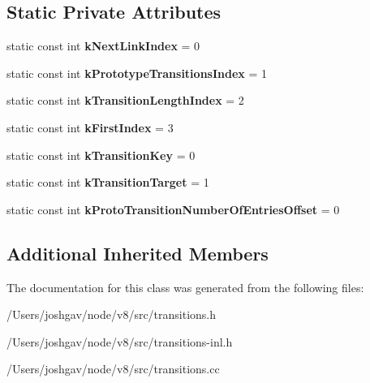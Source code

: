\subsection*{Static Private Attributes}
\begin{DoxyCompactItemize}
\item 
static const int {\bfseries k\+Next\+Link\+Index} = 0\hypertarget{classv8_1_1internal_1_1_transition_array_aec217c560f9c934a25f06aac965f37a6}{}\label{classv8_1_1internal_1_1_transition_array_aec217c560f9c934a25f06aac965f37a6}

\item 
static const int {\bfseries k\+Prototype\+Transitions\+Index} = 1\hypertarget{classv8_1_1internal_1_1_transition_array_af384db47b8e7c19b376a81f4e1361344}{}\label{classv8_1_1internal_1_1_transition_array_af384db47b8e7c19b376a81f4e1361344}

\item 
static const int {\bfseries k\+Transition\+Length\+Index} = 2\hypertarget{classv8_1_1internal_1_1_transition_array_ade632e34d0d93ba7b62f0cb4e7107290}{}\label{classv8_1_1internal_1_1_transition_array_ade632e34d0d93ba7b62f0cb4e7107290}

\item 
static const int {\bfseries k\+First\+Index} = 3\hypertarget{classv8_1_1internal_1_1_transition_array_a1c836938acaf06ce7778b30631cfaf86}{}\label{classv8_1_1internal_1_1_transition_array_a1c836938acaf06ce7778b30631cfaf86}

\item 
static const int {\bfseries k\+Transition\+Key} = 0\hypertarget{classv8_1_1internal_1_1_transition_array_aeb8fa0752595521dcc2e975f98b00180}{}\label{classv8_1_1internal_1_1_transition_array_aeb8fa0752595521dcc2e975f98b00180}

\item 
static const int {\bfseries k\+Transition\+Target} = 1\hypertarget{classv8_1_1internal_1_1_transition_array_a8643d91e4814b315e7d6c695f9a47142}{}\label{classv8_1_1internal_1_1_transition_array_a8643d91e4814b315e7d6c695f9a47142}

\item 
static const int {\bfseries k\+Proto\+Transition\+Number\+Of\+Entries\+Offset} = 0\hypertarget{classv8_1_1internal_1_1_transition_array_aadebf642725fa329082cd09337eacc6a}{}\label{classv8_1_1internal_1_1_transition_array_aadebf642725fa329082cd09337eacc6a}

\end{DoxyCompactItemize}
\subsection*{Additional Inherited Members}


The documentation for this class was generated from the following files\+:\begin{DoxyCompactItemize}
\item 
/\+Users/joshgav/node/v8/src/transitions.\+h\item 
/\+Users/joshgav/node/v8/src/transitions-\/inl.\+h\item 
/\+Users/joshgav/node/v8/src/transitions.\+cc\end{DoxyCompactItemize}
